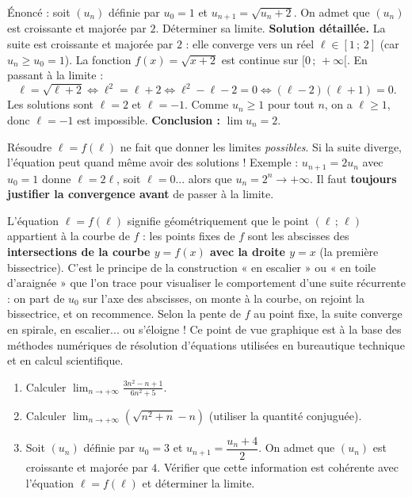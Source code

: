 \documentclass[11pt]{article}
\begin{document}
\begin{exoresolu}
Énoncé : soit $(u_n)$ définie par $u_0 = 1$ et $u_{n+1} = \sqrt{u_n + 2}$. On admet que $(u_n)$ est croissante et majorée par $2$. Déterminer sa limite.
\tcblower
\textbf{Solution détaillée.} La suite est croissante et majorée par $2$ : elle converge vers un réel $\ell \in [1\,;\,2]$ (car $u_n \ge u_0 = 1$). La fonction $f(x) = \sqrt{x+2}$ est continue sur $[0\,;\,+\infty[$. En passant à la limite :
\[ \ell = \sqrt{\ell + 2} \iff \ell^2 = \ell + 2 \iff \ell^2 - \ell - 2 = 0 \iff (\ell - 2)(\ell + 1) = 0. \]
Les solutions sont $\ell = 2$ et $\ell = -1$. Comme $u_n \ge 1$ pour tout $n$, on a $\ell \ge 1$, donc $\ell = -1$ est impossible. \textbf{Conclusion :} $\lim u_n = 2$.
\end{exoresolu}

\begin{attention}[L'équation $\ell = f(\ell)$ ne suffit pas à prouver la convergence]
Résoudre $\ell = f(\ell)$ ne fait que donner les limites \emph{possibles}. Si la suite diverge, l'équation peut quand même avoir des solutions ! Exemple : $u_{n+1} = 2u_n$ avec $u_0 = 1$ donne $\ell = 2\ell$, soit $\ell = 0$... alors que $u_n = 2^n \to +\infty$. Il faut \textbf{toujours justifier la convergence avant} de passer à la limite.
\end{attention}

\begin{savaistu}
L'équation $\ell = f(\ell)$ signifie géométriquement que le point $(\ell\,;\,\ell)$ appartient à la courbe de $f$ : les points fixes de $f$ sont les abscisses des \textbf{intersections de la courbe $y = f(x)$ avec la droite $y = x$} (la première bissectrice). C'est le principe de la construction « en escalier » ou « en toile d'araignée » que l'on trace pour visualiser le comportement d'une suite récurrente : on part de $u_0$ sur l'axe des abscisses, on monte à la courbe, on rejoint la bissectrice, et on recommence. Selon la pente de $f$ au point fixe, la suite converge en spirale, en escalier... ou s'éloigne ! Ce point de vue graphique est à la base des méthodes numériques de résolution d'équations utilisées en bureautique technique et en calcul scientifique.
\end{savaistu}

\begin{exercice}
\begin{enumerate}
\item Calculer $\displaystyle\lim_{n\to+\infty} \frac{3n^2 - n + 1}{6n^2 + 5}$.
\item Calculer $\displaystyle\lim_{n\to+\infty} \left(\sqrt{n^2 + n} - n\right)$ (utiliser la quantité conjuguée).
\item Soit $(u_n)$ définie par $u_0 = 3$ et $u_{n+1} = \dfrac{u_n + 4}{2}$. On admet que $(u_n)$ est croissante et majorée par $4$. Vérifier que cette information est cohérente avec l'équation $\ell = f(\ell)$ et déterminer la limite.
\end{enumerate}
\end{exercice}
\end{document}
